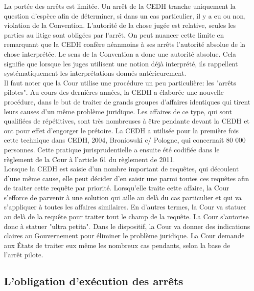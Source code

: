 \documentclass[10pt, a4paper, openany]{book}
\begin{document}
La portée des arrêts est limitée. Un arrêt de la CEDH tranche uniquement la question d'espèce afin de déterminer, si dans un cas particulier, il y a eu ou non, violation de la Convention. L'autorité de la chose jugée est relative, seules les parties au litige sont obligées par l'arrêt. On peut nuancer cette limite en remarquant que la CEDH confère néanmoins à ses arrêts l'autorité absolue de la chose interprétée. Le sens de la Convention a donc une autorité absolue. Cela signifie que lorsque les juges utilisent une notion déjà interprété, ils rappellent systématiquement les interprétations donnés antérieurement. \\
Il faut noter que la Cour utilise une procédure un peu particulière: les "arrêts pilotes". Au cours des dernières années, la CEDH a élaborée une nouvelle procédure, dans le but de traiter de grands groupes d'affaires identiques qui tirent leurs causes d'un même problème juridique. Les affaires de ce type, qui sont qualifiées de répétitives, sont très nombreuses à être pendante devant la CEDH et ont pour effet d'engorger le prétoire. La CEDH a utilisée pour la première fois cette technique dans CEDH, 2004, Broniowski c/ Pologne, qui concernait 80 000 personnes. Cette pratique jurisprudentielle a ensuite été codifiée dans le règlement de la Cour à l'article 61 du règlement de 2011. \\
Lorsque la CEDH est saisie d'un nombre important de requêtes, qui découlent d'une même cause, elle peut décider d'en saisir une parmi toutes ces requêtes afin de traiter cette requête par priorité. Lorsqu'elle traite cette affaire, la Cour s'efforce de parvenir à une solution qui aille au delà du cas particulier et qui va s'appliquer à toutes les affaires similaires. En d'autres termes, la Cour va statuer au delà de la requête pour traiter tout le champ de la requête. La Cour s'autorise donc à statuer "ultra petita". Dans le dispositif, la Cour va donner des indications claires au Gouvernement pour éliminer le problème juridique. La Cour demande aux États de traiter eux même les nombreux cas pendants, selon la base de l'arrêt pilote. 

\subsection{L'obligation d'exécution des arrêts}
\end{document}
